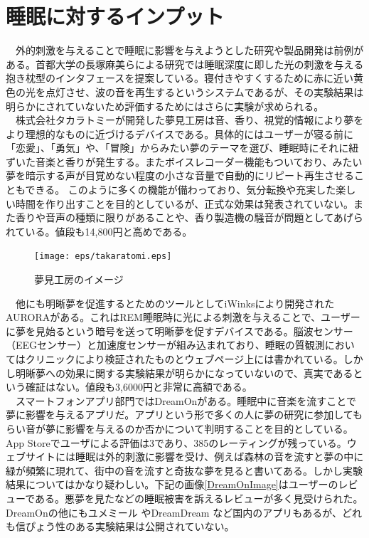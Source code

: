 \section{睡眠に対するインプット}
　外的刺激を与えることで睡眠に影響を与えようとした研究や製品開発は前例がある。首都大学の長塚麻美らによる研究では睡眠深度に即した光の刺激を与える抱き枕型のインタフェースを提案している\cite{sleepSheep}。寝付きやすくするために赤に近い黄色の光を点灯させ、波の音を再生するというシステムであるが、その実験結果は明らかにされていないため評価するためにはさらに実験が求められる。\\
　株式会社タカラトミーが開発した夢見工房は音、香り、視覚的情報により夢をより理想的なものに近づけるデバイスである。具体的にはユーザーが寝る前に「恋愛」、「勇気」や、「冒険」からみたい夢のテーマを選び、睡眠時にそれに紐ずいた音楽と香りが発生する。またボイスレコーダー機能もついており、みたい夢を暗示する声が目覚めない程度の小さな音量で自動的にリピート再生させることもできる。 \cite{takaratomi}このように多くの機能が備わっており、気分転換や充実した楽しい時間を作り出すことを目的としているが、正式な効果は発表されていない。また香りや音声の種類に限りがあることや、香り製造機の騒音が問題としてあげられている。値段も14,800円と高めである。
\begin{figure}[htbp]
\begin{center}
\texttt{[image: eps/takaratomi.eps]}
\caption{夢見工房のイメージ}
\label{takaratomi}
\end{center}
\end{figure}

　他にも明晰夢を促進するとためのツールとしてiWinksにより開発されたAURORAがある。\cite{iWinks}これはREM睡眠時に光による刺激を与えることで、ユーザーに夢を見始るという暗号を送って明晰夢を促すデバイスである。脳波センサー（EEGセンサー）と加速度センサーが組み込まれており、睡眠の質観測においてはクリニックにより検証されたものとウェブページ上には書かれている。しかし明晰夢への効果に関する実験結果が明らかになっていないので、真実であるという確証はない。値段も3,6000円と非常に高額である。\\
　スマートフォンアプリ部門ではDreamOnがある。睡眠中に音楽を流すことで夢に影響を与えるアプリだ。アプリという形で多くの人に夢の研究に参加してもらい音が夢に影響を与えるのか否かについて判明することを目的としている。 \cite{dreamOn}App Storeでユーザによる評価は3であり、385のレーティングが残っている。ウェブサイトには睡眠は外的刺激に影響を受け、例えば森林の音を流すと夢の中に緑が頻繁に現れて、街中の音を流すと奇抜な夢を見ると書いてある。しかし実験結果についてはかなり疑わしい。下記の画像\ref{DreamOnImage}はユーザーのレビューである。悪夢を見たなどの睡眠被害を訴えるレビューが多く見受けられた。DreamOnの他にもユメミール \cite{yumemiru}やDreamDream \cite{DreamDream}など国内のアプリもあるが、どれも信ぴょう性のある実験結果は公開されていない。

